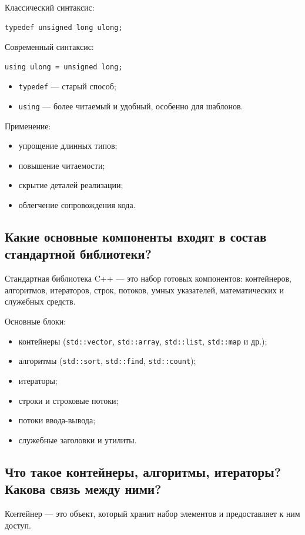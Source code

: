 Классический синтаксис:
\begin{verbatim}
typedef unsigned long ulong;
\end{verbatim}

Современный синтаксис:
\begin{verbatim}
using ulong = unsigned long;
\end{verbatim}

\begin{itemize}
    \item \texttt{typedef} — старый способ;
    \item \texttt{using} — более читаемый и удобный, особенно для шаблонов.
\end{itemize}

Применение:
\begin{itemize}
    \item упрощение длинных типов;
    \item повышение читаемости;
    \item скрытие деталей реализации;
    \item облегчение сопровождения кода.
\end{itemize}

\subsection{Какие основные компоненты входят в состав стандартной библиотеки?}
\begin{definition}
Стандартная библиотека C++ — это набор готовых компонентов: контейнеров, алгоритмов, итераторов, строк, потоков, умных указателей, математических и служебных средств.
\end{definition}

Основные блоки:
\begin{itemize}
    \item контейнеры (\texttt{std::vector}, \texttt{std::array}, \texttt{std::list}, \texttt{std::map} и др.);
    \item алгоритмы (\texttt{std::sort}, \texttt{std::find}, \texttt{std::count});
    \item итераторы;
    \item строки и строковые потоки;
    \item потоки ввода-вывода;
    \item служебные заголовки и утилиты.
\end{itemize}

\subsection{Что такое контейнеры, алгоритмы, итераторы? Какова связь между ними?}
\begin{definition}[Контейнер]
Контейнер — это объект, который хранит набор элементов и предоставляет к ним доступ.
\end{definition}

